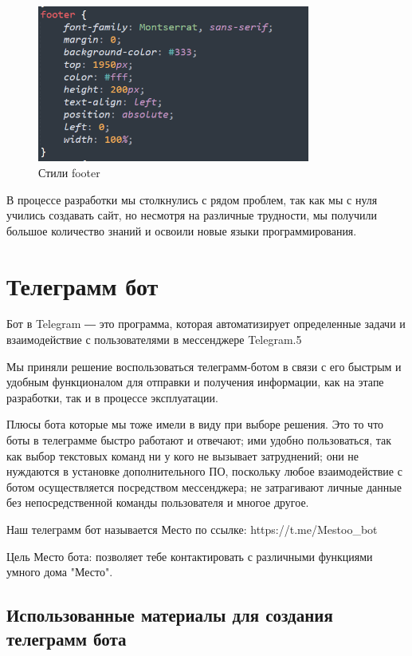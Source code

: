 \begin{figure}[h!]
	\centering
	\label{fig:img23}
	\includegraphics[width=0.8\textwidth]{./graphics/img/image23.png}
	\caption{Стили footer}
\end{figure}	

В процессе разработки мы столкнулись с рядом проблем, так как мы с нуля учились создавать сайт, но несмотря на различные трудности, мы получили большое количество знаний и освоили новые языки программирования.

\chapter{Телеграмм бот}

Бот в Telegram ― это программа, которая автоматизирует определенные задачи и взаимодействие с пользователями в мессенджере Telegram.5

Мы приняли решение воспользоваться телеграмм-ботом в связи с его быстрым и удобным функционалом для отправки и получения информации, как на этапе разработки, так и в процессе эксплуатации.

Плюсы бота которые мы тоже имели в виду при выборе решения. Это то что боты в телеграмме быстро работают и отвечают; ими удобно пользоваться, так как выбор текстовых команд ни у кого не вызывает затруднений; они не нуждаются в установке дополнительного ПО, поскольку любое взаимодействие с ботом осуществляется посредством мессенджера; не затрагивают личные данные без непосредственной команды пользователя и многое другое.

Наш телеграмм бот называется Место по ссылке: https://t.me/Mestoo\_bot 

Цель Место бота: позволяет тебе контактировать с различными функциями умного дома "Место".

\section{Использованные материалы для создания телеграмм бота}

